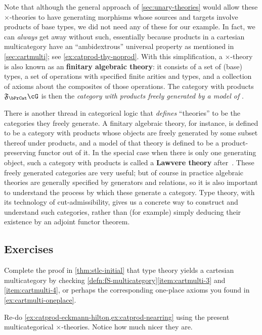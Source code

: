 \documentclass{book}
\newcommand{\F}[1]{\mathfrak{F}_{#1}}
\begin{document}
Note that although the general approach of \cref{sec:unary-theories} would allow these $\times$-theories to have generating morphisms whose sources and targets involve products of base types, we did not need any of these for our example.
In fact, we can \emph{always} get away without such, essentially because products in a cartesian multicategory have an ``ambidextrous'' universal property as mentioned in \cref{sec:cartmulti}; see \cref{ex:catprod-thy-noprod}.
With this simplification, a $\times$-theory is also known as an \textbf{finitary algebraic theory}: it consists of a set of (base) types, a set of operations with specified finite arities and types, and a collection of axioms about the composites of those operations.
The category with products $\F\bPrCat\cG$ is then the \emph{category with products freely generated by a model of \cG}.

There is another thread in categorical logic that \emph{defines} ``theories'' to be the categories they freely generate.
A finitary algebraic theory, for instance, is defined to be a category with products whose objects are freely generated by some subset thereof under products, and a model of that theory is defined to be a product-preserving functor out of it.
In the special case when there is only one generating object, such a category with products is called a \textbf{Lawvere theory} after~\cite{lawvere:functsem}.
These freely generated categories are very useful; but of course in practice algebraic theories are generally specified by generators and relations, so it is also important to understand the process by which these generate a category.
Type theory, with its technology of cut-admissibility, gives us a concrete way to construct and understand such categories, rather than (for example) simply deducing their existence by an adjoint functor theorem.


\subsection*{Exercises}

\begin{ex}\label{ex:stlc-cartmulti}
  Complete the proof in \cref{thm:stlc-initial} that type theory yields a cartesian multicategory by checking \cref{defn:fS-multicategory}\ref{item:cartmulti-3} and \ref{item:cartmulti-4}, or perhaps the corresponding one-place axioms you found in \cref{ex:cartmulti-oneplace}.
\end{ex}

\begin{ex}\label{ex:catprod-ehnr-again}
  Re-do \cref{ex:catprod-eckmann-hilton,ex:catprod-nearring} using the present multicategorical $\times$-theories.
  Notice how much nicer they are.
\end{ex}
\end{document}
